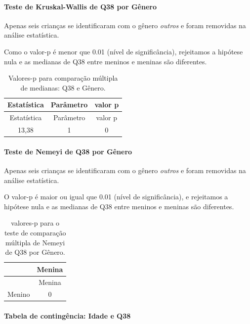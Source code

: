 \documentclass[]{article}
\let\oldparagraph\paragraph
\renewcommand{\paragraph}[1]{\oldparagraph{#1}\mbox{}}
\begin{document}
\hypertarget{teste-de-kruskal-wallis-de-q38-por-guxeanero}{%
\paragraph{Teste de Kruskal-Wallis de Q38 por Gênero}\label{teste-de-kruskal-wallis-de-q38-por-guxeanero}}

Apenas seis crianças se identificaram com o gênero \emph{outros} e foram removidas na análise estatística.

Como o valor-p é menor que 0.01 (nível de significância), rejeitamos a hipótese nula e as medianas de Q38 entre meninos e meninas são diferentes.

\begin{longtable}[]{@{}ccc@{}}
\caption{\label{tab:unnamed-chunk-1445}Valores-p para comparação múltipla de medianas: Q38 e Gênero.}\tabularnewline
\toprule
Estatística & Parâmetro & valor p\tabularnewline
\midrule
\endfirsthead
\toprule
Estatística & Parâmetro & valor p\tabularnewline
\midrule
\endhead
13,38 & 1 & 0\tabularnewline
\bottomrule
\end{longtable}

\hypertarget{teste-de-nemeyi-de-q38-por-guxeanero}{%
\paragraph{Teste de Nemeyi de Q38 por Gênero}\label{teste-de-nemeyi-de-q38-por-guxeanero}}

Apenas seis crianças se identificaram com o gênero \emph{outros} e foram removidas na análise estatística.

O valor-p é maior ou igual que 0.01 (nível de significância), e rejeitamos a hipótese nula e as medianas de Q38 entre meninos e meninas são diferentes.

\begin{longtable}[]{@{}lc@{}}
\caption{\label{tab:unnamed-chunk-1447}valores-p para o teste de comparação múltipla de Nemeyi de Q38 por Gênero.}\tabularnewline
\toprule
& Menina\tabularnewline
\midrule
\endfirsthead
\toprule
& Menina\tabularnewline
\midrule
\endhead
Menino & 0\tabularnewline
\bottomrule
\end{longtable}

\cleardoublepage

\hypertarget{tabela-de-continguxeancia-idade-e-q38}{%
\paragraph{Tabela de contingência: Idade e Q38}\label{tabela-de-continguxeancia-idade-e-q38}}
\end{document}
